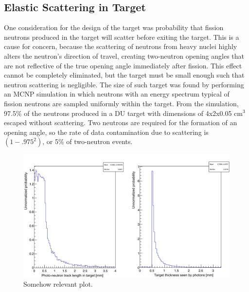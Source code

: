 \subsection{Elastic Scattering in Target}
One consideration for the design of the target was probability that fission neutrons produced in the target will scatter before exiting the target.
This is a cause for concern, because the scattering of neutrons from heavy nuclei highly alters the neutron's direction of travel, creating two-neutron opening angles that are not reflective of the true opening angle immediately after fission.
This effect cannot be completely eliminated, but the target must be small enough such that neutron scattering is negligible.
The size of such target was found by performing an MCNP simulation in which neutrons with an energy spectrum typical of fission neutrons are sampled uniformly within the target.
From the simulation, 97.5\% of the neutrons produced in a DU target with dimensions of 4x2x0.05 $\text{cm}^3$ escaped without scattering.
Two neutrons are required for the formation of an opening angle, so the rate of data contamination due to scattering is $(1-.975^2)$, or 5\% of two-neutron events.
\begin{figure}
    \centering
    \includegraphics[width = \textwidth]{Content/Errors/ScatteringInTarget.png}
    \caption{Somehow relevant plot.}
    \label{fig:ScatteringInTarget}
\end{figure}
